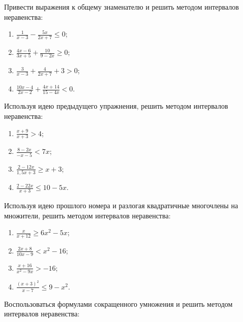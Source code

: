 \documentclass[algebra,a5paper]{pum}
\date{12.05.20}
\begin{document}
\begin{exercises}
  \begin{question}
    Привести выражения к общему знаменателю и решить методом интервалов неравенства:
    \begin{multicols}{2}
    \begin{enumerate}[itemsep=6pt]
      \item $\frac{1}{x-3}-\frac{5x}{2x+7}\le0$;
      \item $\frac{4x-6}{3x+5}+\frac{10}{9-2x}\ge0$;
      \item $\frac{3}{x-3}+\frac{4}{2x+7}+3>0$;
      \item $\frac{10x-4}{2x-2}+\frac{4x+14}{15-4x}<0$.
    \end{enumerate}
    \end{multicols}
  \end{question}
  \begin{question}
    Используя идею предыдущего упражнения, решить методом интервалов неравенства:
    \begin{multicols}{2}
      \begin{enumerate}[itemsep=6pt]
        \item $\frac{x+9}{x+3}>4$;
        \item $\frac{8-2x}{-x-5}<7x$;
        \item $\frac{2-12x}{1,5x+3}\ge x+3$;
        \item $\frac{2-22x}{x+3}\le 10-5x$.
      \end{enumerate}
    \end{multicols}
  \end{question}
  \begin{question}
    Используя идею прошлого номера и разлогая квадратичные многочлены на множители, решить методом интервалов неравенства:
    \begin{multicols}{2}
      \begin{enumerate}[itemsep=6pt]
        \item $\frac{x}{x+12}\ge6x^2-5x$;
        \item $\frac{2x+8}{10x-9}<x^2-16$;
        \item $\frac{x+16}{x^2-9x}>-16$;
        \item $\frac{(x+3)^2}{x-7}\le9-x^2$.
      \end{enumerate}
    \end{multicols}
  \end{question}
  \begin{question}
    Воспользоваться формулами сокращенного умножения и решить методом интервалов неравенства:

\end{question}
\end{exercises}
\end{document}
